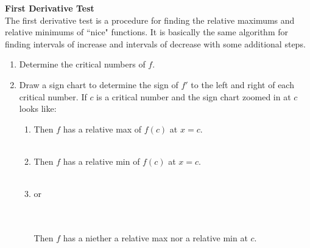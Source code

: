 \documentclass[reqno,psamsfonts]{amsart}
\theoremstyle{definition}
\theoremstyle{remark}
\numberwithin{equation}{section}
\begin{document}
\newpage
\noindent\textbf{First Derivative Test}
\\The first derivative test is a procedure for finding the relative maximums and relative minimums of ``nice" functions. It is basically the same algorithm for finding intervals of increase and intervals of decrease with some additional steps.
\begin{enumerate}
\item Determine the critical numbers of $f$. 
\item Draw a sign chart to determine the sign of $f'$ to the left and right of each critical number. If $c$ is a critical number and the sign chart zoomed in at $c$ looks like:
\begin{enumerate}
\item 
\hspace{2em}
\hspace{2em}Then $f$ has a relative max of $f(c)$ at $x=c$.
\\
\\
\item \hspace{2em}
\hspace{2em}Then $f$ has a relative min of $f(c)$ at $x=c$.
\\
\\
\item \hspace{2em}
\hspace{2em} or\hspace{2em}
\\
\\Then $f$ has a niether a relative max nor a relative min at $c$.
\end{enumerate}
\end{enumerate}
\vspace{2em}
\end{document}
